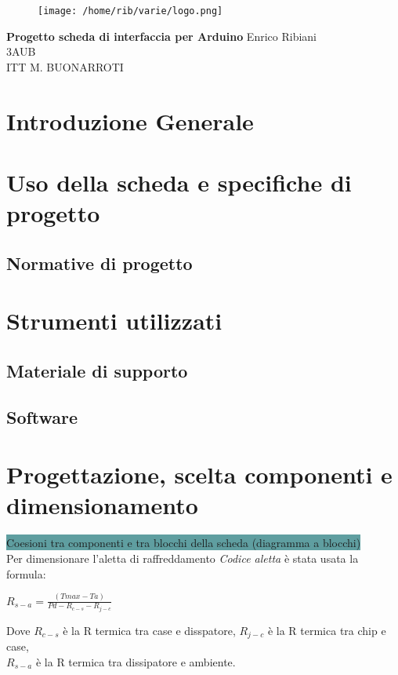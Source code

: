 \documentclass{article}
\begin{document}
    \begin{titlepage}
\begin{flushleft}
\begin{figure}[h]
    \centering
    \texttt{[image: /home/rib/varie/logo.png]}
\end{figure}
\vspace{2\baselineskip}
\Huge{\textbf{Progetto scheda di interfaccia per Arduino}}
\vfill
\LARGE Enrico Ribiani\\
\LARGE 3AUB\\
\vfill
\huge{ITT M. BUONARROTI }

\end{flushleft}
\end{titlepage}
\pagestyle{fancy}
\fancyhead{}
\cfoot{\thepage}

\tableofcontents
\vskip 3cm
\section{Introduzione Generale}
\section{Uso della scheda e specifiche di progetto}
\subsection{Normative di progetto}
\section{Strumenti utilizzati}
\subsection{Materiale di supporto}
\subsection{Software}
\section{Progettazione, scelta componenti e dimensionamento}
\colorbox{CadetBlue}{Coesioni tra componenti e tra blocchi della scheda (diagramma a blocchi) }\\
Per dimensionare l'aletta di raffreddamento \textit{Codice aletta} è stata usata la formula:
\begin{center}
$R_{s-a}=\frac{(Tmax-Ta)}{Pd-R_{c-s}-R_{j-c}}$\\
\end{center}
Dove \textit{$R_{c-s}$} è la R termica tra case e disspatore, \textit{$R_{j-c}$} è la R termica tra chip e case,\\ \textit{$R_{s-a}$} è la R termica tra dissipatore e ambiente.\\
\end{document}
